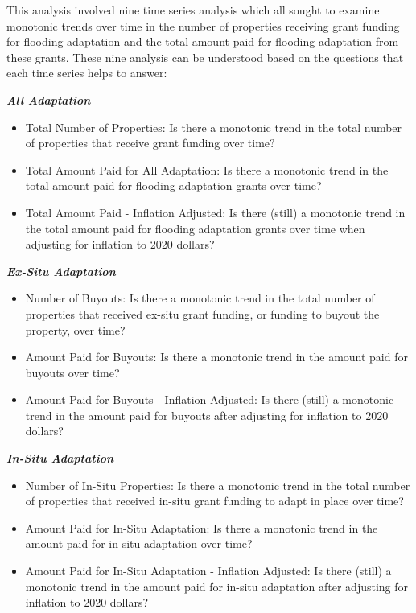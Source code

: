 \documentclass[
  12pt,
]{article}
\begin{document}
This analysis involved nine time series analysis which all sought to
examine monotonic trends over time in the number of properties receiving
grant funding for flooding adaptation and the total amount paid for
flooding adaptation from these grants. These nine analysis can be
understood based on the questions that each time series helps to answer:

\textbf{\emph{All Adaptation}}

\begin{itemize}
\item
  Total Number of Properties: Is there a monotonic trend in the total
  number of properties that receive grant funding over time?
\item
  Total Amount Paid for All Adaptation: Is there a monotonic trend in
  the total amount paid for flooding adaptation grants over time?
\item
  Total Amount Paid - Inflation Adjusted: Is there (still) a monotonic
  trend in the total amount paid for flooding adaptation grants over
  time when adjusting for inflation to 2020 dollars?
\end{itemize}

\textbf{\emph{Ex-Situ Adaptation}}

\begin{itemize}
\item
  Number of Buyouts: Is there a monotonic trend in the total number of
  properties that received ex-situ grant funding, or funding to buyout
  the property, over time?
\item
  Amount Paid for Buyouts: Is there a monotonic trend in the amount paid
  for buyouts over time?
\item
  Amount Paid for Buyouts - Inflation Adjusted: Is there (still) a
  monotonic trend in the amount paid for buyouts after adjusting for
  inflation to 2020 dollars?
\end{itemize}

\textbf{\emph{In-Situ Adaptation}}

\begin{itemize}
\item
  Number of In-Situ Properties: Is there a monotonic trend in the total
  number of properties that received in-situ grant funding to adapt in
  place over time?
\item
  Amount Paid for In-Situ Adaptation: Is there a monotonic trend in the
  amount paid for in-situ adaptation over time?
\item
  Amount Paid for In-Situ Adaptation - Inflation Adjusted: Is there
  (still) a monotonic trend in the amount paid for in-situ adaptation
  after adjusting for inflation to 2020 dollars?
\end{itemize}
\end{document}

